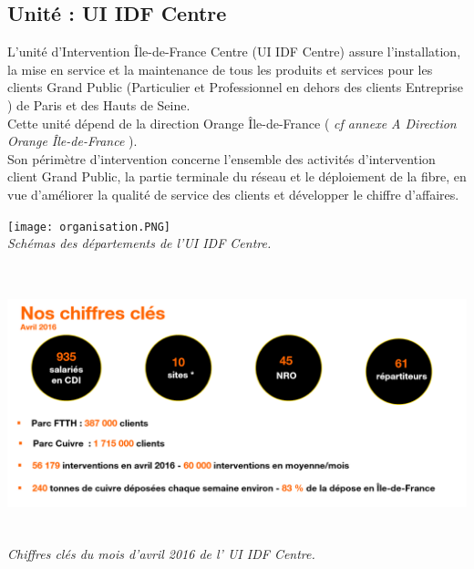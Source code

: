 \documentclass[a4paper,twoside,12pt,openright]{report}
\begin{document}
\subsection{Unité : UI IDF Centre}
L'unité d'Intervention Île-de-France Centre (UI IDF Centre) assure l'installation, la mise en service et la maintenance de tous les produits et services pour les clients Grand Public (Particulier et Professionnel en dehors des clients Entreprise ) de Paris et des Hauts de Seine.\\
Cette unité dépend de la direction Orange Île-de-France (
\emph{cf annexe A Direction Orange Île-de-France}
).\\
Son périmètre d'intervention concerne l'ensemble des activités d'intervention client Grand Public, la partie terminale du réseau et le déploiement de la fibre, en vue d'améliorer la qualité de service des clients et développer le chiffre d'affaires.\\
\begin{center}
\texttt{[image: organisation.PNG]}\\
\itshape Schémas des départements de l'UI IDF Centre.
\end{center}
\begin{center}
\includegraphics[height=8cm]{chiffre.PNG}\\
\itshape Chiffres clés du mois d'avril 2016 de l' UI IDF Centre.
\end{center}
\newpage
\end{document}
